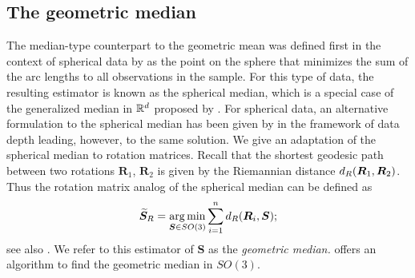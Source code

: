 \subsection{The geometric median}
\label{subsec:lone}
The median-type counterpart to the geometric mean was defined first in the context of
spherical data by \citet{fisher85} as the point on the sphere that minimizes the sum of the arc lengths to all
observations in the sample.   For this type of data, the resulting estimator is known as the spherical median,
 which is a special case of the generalized median in ${\mathbb{R}}^d$
proposed by \citet{gower74}.   For spherical data, an alternative formulation to the
spherical median has been given by \citet{liu92} in the framework of
data depth leading, however, to the same solution. We give an adaptation of the spherical median to rotation matrices. 
Recall that the shortest geodesic path between two rotations ${\bm R_1}$, ${\bm R_2}$ is given by the Riemannian distance ${d_R}(\bm R_1,\bm R_2)$.  Thus the rotation matrix analog of the \cite{fisher85} spherical
median can be defined as
\begin{equation}\label{est:lone}
{\widetilde{\bm S}_R}=\operatorname*{arg\,min}_{\bm{S}\in
SO(3)}\sum_{i=1}^n{d_R}(\bm{R}_i,\bm{S});
\end{equation}
see also \cite{fletcher08, fletcher09}.  We refer to this estimator of $\bm{S}$ as the \textit{geometric median.}  \citet{hartley11} offers an algorithm to find the geometric median in $SO(3)$.

